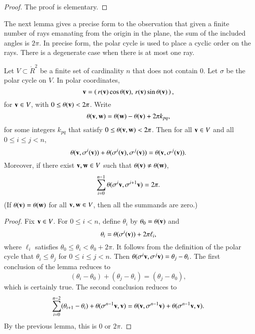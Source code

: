 \begin{proof} The proof is elementary.
\end{proof}

The next lemma gives a precise form to the observation
that given a finite number of rays emanating from the origin
in the plane, the sum of the included angles is $2\pi$.
In precise form, the polar cycle is used to place
a cyclic order on the rays.  There is a degenerate case
when there is at most one ray.


\begin{lemma}[]\label{lemma:polar-sum}
  Let $V\subset\ring{R}^2$ be a finite set of cardinality $n$ that
  does not contain $0$.  Let $\sigma$ be the polar cycle on $V$.  In
  polar coordinates,
\begin{displaymath}
{\mathbf v}=\left(\, r({\mathbf v})\cos\theta({\mathbf v}),\, r({\mathbf v})\sin\theta({\mathbf v})\,\right),
\end{displaymath} 
for ${\mathbf v}\in V$, with
$0\le\theta({\mathbf v})<2\pi$.
Write
\begin{displaymath}
\theta({\mathbf v},{\mathbf w}) = \theta({\mathbf w}) - \theta({\mathbf v}) + 2\pi k_{pq},
\end{displaymath}
for some integers $k_{pq}$ that satisfy $0\le \theta({\mathbf v},{\mathbf w}) < 2\pi$.
Then for all ${\mathbf v}\in V$
and all $0\le i \le j < n$,
\begin{displaymath}
\theta({\mathbf v},\sigma^i({\mathbf v})) +\theta(\sigma^i({\mathbf v}),\sigma^j({\mathbf v})) =
\theta({\mathbf v},\sigma^j({\mathbf v})).
\end{displaymath}
Moreover, if there exist ${\mathbf v},{\mathbf w}\in V$ such that $\theta({\mathbf v})\ne\theta({\mathbf w})$,
\begin{displaymath}
\sum_{i=0}^{n-1} \theta(\sigma^{i}{\mathbf v},\sigma^{i+1} {\mathbf v}) = 2\pi.
\end{displaymath}
(If $\theta({\mathbf v})=\theta({\mathbf w})$ for all ${\mathbf v},{\mathbf w}\in V$, then all the
summands are zero.)
\end{lemma}
%

\begin{proof}
Fix ${\mathbf v}\in V$.
For $0\le i<n$, define $\theta_i$ by
$\theta_0=\theta({\mathbf v})$ and 
\begin{displaymath}\theta_i = \theta(\sigma^i({\mathbf v})) + 2\pi \ell_i,
\end{displaymath}
where  $\ell_i$ satisfies $\theta_0\le \theta_i < \theta_0+2\pi$.
It follows from the definition of the polar cycle that
$\theta_i \le \theta_j$ for $0\le i\le j < n$.  Then
$\theta(\sigma^i {\mathbf v} ,\sigma^j {\mathbf v}) = \theta_j - \theta_i$.
The first conclusion of the lemma reduces to
\begin{displaymath}
(\theta_i-\theta_0) + (\theta_j-\theta_i) = (\theta_j-\theta_0),
\end{displaymath}
which is certainly true.
The second conclusion reduces to
\begin{displaymath}
\sum_{i=0}^{n-2} (\theta_{i+1}-\theta_i) + \theta(\sigma^{n-1}{\mathbf v},{\mathbf v})
= \theta({\mathbf v},\sigma^{n-1}{\mathbf v}) + \theta(\sigma^{n-1}{\mathbf v},{\mathbf v}).
\end{displaymath}
By the previous lemma, this is $0$ or $2\pi$.
\end{proof}


